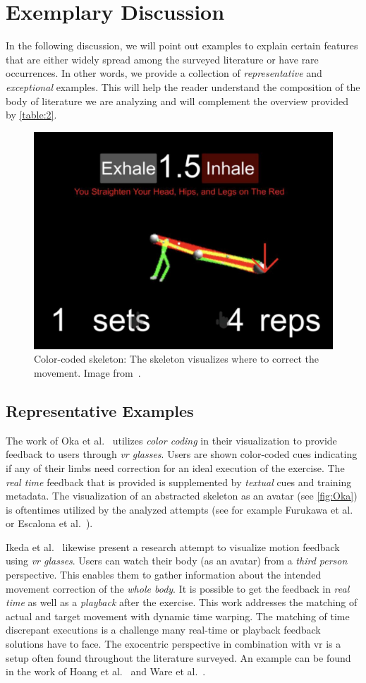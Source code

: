 \section{Exemplary Discussion \label{sec:exemplary}}
In the following discussion, we will point out examples to explain certain features that are either widely spread among the surveyed literature or have rare occurrences. In other words, we provide a collection of \textit{representative} and \textit{exceptional} examples. This will help the reader understand the composition of the body of literature we are analyzing and will complement the overview provided by \autoref{table:2}.
\begin{figure}[h!t]
    \centering
    \includegraphics[width=0.6\linewidth]{pictures/Oka.PNG}
    \caption[Example of a color-coded skeleton.]{Color-coded skeleton: The skeleton visualizes where to correct the movement. Image from~\cite{oka2021rtf}.\label{fig:Oka}}
\end{figure}

\subsection{Representative Examples}
The work of Oka et al.~\cite{oka2021rtf} utilizes \emph{color coding} in their visualization to provide feedback to users through \emph{\acrshort{vr} glasses}. Users are shown color-coded cues indicating if any of their limbs need correction for an ideal execution of the exercise. The \emph{real time} feedback that is provided is supplemented by \emph{textual} cues and training metadata. The visualization of an abstracted skeleton as an avatar (see \autoref{fig:Oka}) is oftentimes utilized by the analyzed attempts (see for example Furukawa et al.~\cite{furukawa2018dar} or Escalona et al.~\cite{escalona2020eva}).


Ikeda et al.~\cite{ikeda2018arb} likewise present a research attempt to visualize motion feedback using \emph{\acrshort{vr} glasses}. Users can watch their body (as an avatar) from a \emph{third person} perspective. This enables them to gather information about the intended movement correction of the \emph{whole body}. It is possible to get the feedback in \emph{real time} as well as a \emph{playback} after the exercise. This work addresses the matching of actual and target movement with dynamic time warping. The matching of time discrepant executions is a challenge many real-time or playback feedback solutions have to face. The exocentric perspective in combination with \acrshort{vr} is a setup often found throughout the literature surveyed. An example can be found in the work of Hoang et al.~\cite{hoang2016orp} and Ware et al.~\cite{ware2020wo2}.

